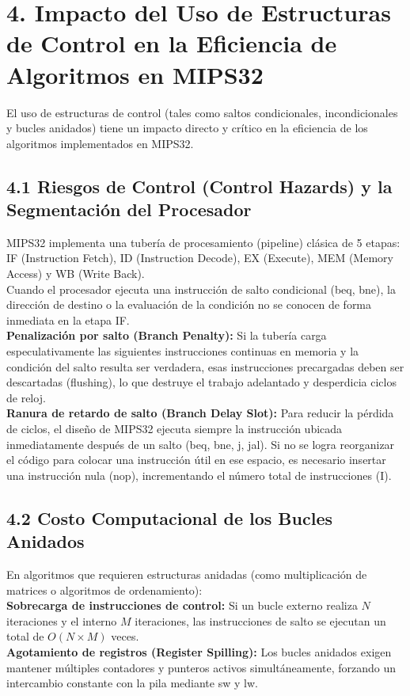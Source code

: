 \documentclass[12pt,a4paper]{article}
\begin{document}
\section*{4. Impacto del Uso de Estructuras de Control en la Eficiencia de Algoritmos en MIPS32}
El uso de estructuras de control (tales como saltos condicionales, incondicionales y bucles anidados) tiene un impacto directo y crítico en la eficiencia de los algoritmos implementados en MIPS32.

\subsection*{4.1 Riesgos de Control (Control Hazards) y la Segmentación del Procesador}
MIPS32 implementa una tubería de procesamiento (pipeline) clásica de 5 etapas: IF (Instruction Fetch), ID (Instruction Decode), EX (Execute), MEM (Memory Access) y WB (Write Back).\\
Cuando el procesador ejecuta una instrucción de salto condicional (beq, bne), la dirección de destino o la evaluación de la condición no se conocen de forma inmediata en la etapa IF.\\
\textbf{Penalización por salto (Branch Penalty):} Si la tubería carga especulativamente las siguientes instrucciones continuas en memoria y la condición del salto resulta ser verdadera, esas instrucciones precargadas deben ser descartadas (flushing), lo que destruye el trabajo adelantado y desperdicia ciclos de reloj.\\
\textbf{Ranura de retardo de salto (Branch Delay Slot):} Para reducir la pérdida de ciclos, el diseño de MIPS32 ejecuta siempre la instrucción ubicada inmediatamente después de un salto (beq, bne, j, jal). Si no se logra reorganizar el código para colocar una instrucción útil en ese espacio, es necesario insertar una instrucción nula (nop), incrementando el número total de instrucciones (I).

\subsection*{4.2 Costo Computacional de los Bucles Anidados}
En algoritmos que requieren estructuras anidadas (como multiplicación de matrices o algoritmos de ordenamiento):\\
\textbf{Sobrecarga de instrucciones de control:} Si un bucle externo realiza $N$ iteraciones y el interno $M$ iteraciones, las instrucciones de salto se ejecutan un total de $O(N \times M)$ veces.\\
\textbf{Agotamiento de registros (Register Spilling):} Los bucles anidados exigen mantener múltiples contadores y punteros activos simultáneamente, forzando un intercambio constante con la pila mediante sw y lw.
\end{document}
